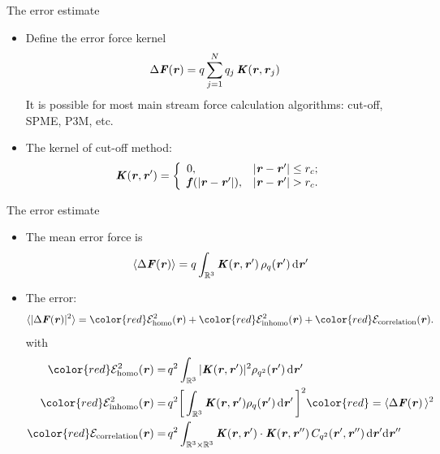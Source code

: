 \documentclass{beamer}
\newcommand{\redc}[1]{{\color{red} #1}}
\newcommand{\bluec}[1]{{\color{blue} #1}}
\newcommand{\vect}[1]{\textbf{\textit{#1}}}
\renewcommand{\d}[1]{\textrm{#1}}
\begin{document}
\begin{frame}{The error estimate}
  \begin{itemize}
  \item <1-> Define the error force kernel
    \bluec{
      \begin{align*}
        \Delta \vect F(\vect r)
        &=
        q \sum_{j=1}^N q_j \,\vect K(\vect r, \vect r_j)
      \end{align*}}
    It is possible for most main stream force calculation algorithms: cut-off, SPME, P3M, etc.
  \item <2-> The kernel of cut-off method:
    \bluec{
      \begin{align*}
        \vect K(\vect r,\vect r') =
        \left\{
          \begin{array}{ll}
            0, & \vert\vect r - \vect r'\vert\leq r_c; \\
            \vect f(\vert\vect r-\vect r'\vert), & \vert\vect r - \vect r'\vert > r_c.
          \end{array}
        \right.
      \end{align*}}
    \vfill
  \end{itemize}
\end{frame}

\begin{frame}{The error estimate}
  \begin{itemize}\itemsep -10pt
  \item<1->   The mean error force is
    \bluec{
      \begin{align*}
        \langle\Delta\vect F(\vect r)\rangle
        =
        q\int_{\mathbb R^3}\vect K(\vect r , \vect r')\,\rho_q(\vect r')\,\d d\vect r'
      \end{align*}
    }
  \vskip -10cm
\item<2->   The error:
  \bluec{
    \begin{align*} \nonumber
      \langle\vert\Delta\vect F(\vect r)\vert^2\rangle
      = 
      \redc{\mathcal E^2_{\textrm{homo}}(\vect r)} +
      \redc{\mathcal E^2_{\textrm{inhomo}}(\vect r)} +
      \redc{\mathcal E_{\textrm{correlation}}(\vect r)}.
    \end{align*}
  }
  with\bluec{
  \begin{align*}
    \redc{\mathcal E^2_{\textrm{homo}}(\vect r)}
    = &\,
    q^2\int_{\mathbb R^3}\vert\vect K(\vect r, \vect r')\vert^2\rho_{q^2}(\vect r')\,\d d\vect r'  \\
    \redc{\mathcal E^2_{\textrm{inhomo}}(\vect r)}
    = &\,
    q^2\bigg[\int_{\mathbb R^3}\vect K(\vect r, \vect r')\rho_q(\vect r')\,\d d\vect r'\,\bigg]^2
    \redc{ = \langle\Delta\vect F(\vect r)\,\rangle^2}
    \\
    \redc{\mathcal E_{\textrm{correlation}}(\vect r)}
    =&\,
    q^2\int_{\mathbb R^3\times\mathbb R^3}\vect K(\vect r, \vect r')\cdot\vect K(\vect r, \vect r'')\,C_{q^2}(\vect r', \vect r'')\,\d d\vect r'\d d\vect r''
  \end{align*}}
  \end{itemize}
\end{frame}
\end{document}

